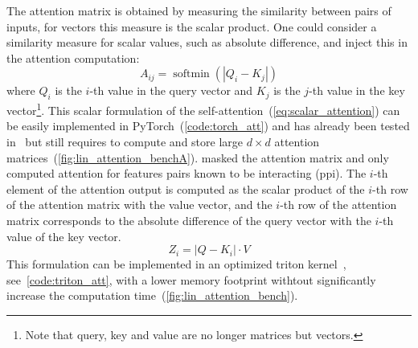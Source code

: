 \documentclass[../main.tex]{subfiles}
\begin{document}
		The attention matrix is obtained by measuring the similarity between pairs of inputs, for vectors this measure is the scalar product.
		One could consider a similarity measure for scalar values, such as absolute difference, and inject this in the attention computation:
		\begin{equation}
			A_{ij} = \operatorname{softmin}\left(\left|Q_{i} - K_{j} \right| \right) \label{eq:scalar_attention}
		\end{equation}
		where \(Q_{i}\) is the \(i\)-th value in the query vector and \(K_{j}\) is the \(j\)-th value in the key vector\footnote{Note that query, key and value are no longer matrices but vectors.}.
		This scalar formulation of the self-attention~(\cref{eq:scalar_attention}) can be easily implemented in PyTorch~(\cref{code:torch_att}) and has already been tested in~\cite{Lacan2023} but still requires to compute and store large \(d\times d\) attention matrices~(\cref{fig:lin_attention_benchA}).
		\citeauthor{Lacan2023} masked the attention matrix and only computed attention for features pairs known to be interacting (\gls{ppi})\cite{Lacan2023}.
		The \(i\)-th element of the attention output is computed as the scalar product of the \(i\)-th row of the attention matrix with the value vector, and the \(i\)-th row of the attention matrix corresponds to the absolute difference of the query vector with the \(i\)-th value of the key vector.
		\begin{equation}
			Z_{i} = \left| Q - K_{i} \right| \cdot V
		\end{equation}
		This formulation can be implemented in an optimized triton kernel~\cite{TritonLang}, see~\cref{code:triton_att}, with a lower memory footprint withtout significantly increase the computation time~(\cref{fig:lin_attention_bench}).
\end{document}

